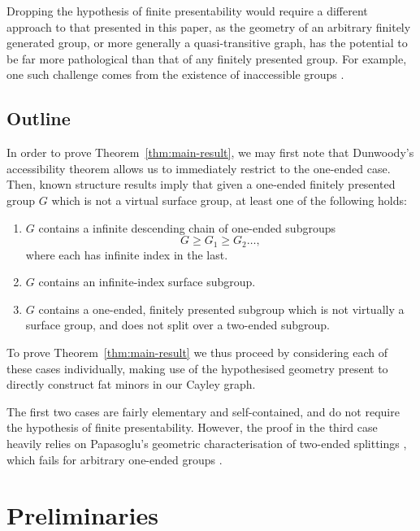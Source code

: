 \documentclass[10pt,a4paper]{amsart}
\theoremstyle{definition}
\begin{document}
Dropping the hypothesis of finite presentability would require a different approach to that presented in this paper, as the geometry of an arbitrary finitely generated group, or more generally a quasi-transitive graph, has the potential to be far more pathological than that of any finitely presented group. For example, one such challenge comes from the existence of inaccessible groups \cite{dunwoody1993inaccessible}. 


\subsection*{Outline}

In order to prove Theorem~\ref{thm:main-result}, we may first note that Dunwoody's accessibility theorem \cite{dunwoody1985accessibility} allows us to immediately restrict to the one-ended case. Then, known structure results  imply that given a one-ended finitely presented group $G$ which is not a virtual surface group, at least one of the following holds:
\begin{enumerate}
	
	\item $G$ contains a infinite descending chain of one-ended subgroups
	$$
	G \geq G_1 \geq G_2 \ldots ,
	$$ 
	where each has infinite index in the last. 
	
	\item $G$ contains an infinite-index surface subgroup. 
	\item\label{itm:third} $G$ contains a one-ended, finitely presented subgroup which is not virtually a surface group, and does not split over a two-ended subgroup.
\end{enumerate}


To prove Theorem~\ref{thm:main-result} we thus proceed by considering each of these cases individually, making use of the hypothesised geometry present to directly construct fat minors in our Cayley graph. 

The first two cases are fairly elementary and self-contained, and do not require the hypothesis of finite presentability. However, the proof in the third case heavily relies on Papasoglu's geometric characterisation of two-ended splittings \cite{papasoglu2005quasi}, which fails for arbitrary one-ended groups \cite{papasoglu2012splittings}. 



\section{Preliminaries}\label{sec:prelims}
\end{document}
